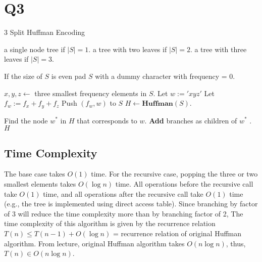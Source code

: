 \section*{Q3}

\begin{algorithm}[H]
\caption{3 Split Huffman Encoding}  
\begin{algorithmic}[1]
\vspace{1em}

 

    \vspace{1em}
     
        \State \Return a single node tree if $|S| = 1$.
        \State \Return a tree with two leaves if $|S| = 2$.
        \State \Return a tree with three leaves if $|S| = 3$.
    \EndIf

    \vspace{1em}

    \vspace{1em}
    \State If the size of $S$ is even pad $S$ with a dummy character with frequency = 0.

    \vspace{1em}

    \State $x, y, z \gets $ three smallest frequency elements in $S$.
    \State Let $w := 'xyz'$ 
    \State Let $f_w := f_x + f_y + f_z$
    \State Push $(f_w, w)$ to $S$ 
    \State $H \gets \textbf{Huffman}(S)$.

    \vspace{1em}
    \State Find the node $w^*$ in $H$ that corresponds to $w$.
    \State \textbf{Add} branches as children of $w^*$ . 
    \State \Return $H$

    \vspace{1em}
    \EndFunction

\vspace{1em}
\end{algorithmic}
\end{algorithm}

\subsection*{Time Complexity}
The base case takes $O(1)$ time.
For the recursive  case, popping the three or two smallest elements takes $O(\log n)$ time.
All operations before the recursive call take $O(1)$ time, 
and all operations after the recursive call take $O(1)$ time 
(e.g., the tree is implemented using direct access table).
Since branching by factor of 3 will reduce the time complexity more than by branching factor of 2, 
The time complexity of this algorithm is given by the recurrence relation $T(n) \leq T(n - 1) + O(\log n)$ = recurrence relation of original Huffman algorithm.
From lecture, original Huffman algorithm takes $O(n\log n)$, thus, $T(n) \in O(n \log n)$.


